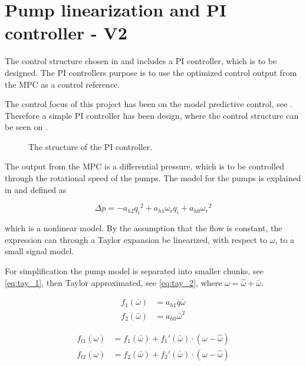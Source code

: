 \chapter{Pump linearization and PI controller - V2}
\label{cha:linear_pump2}

The control structure chosen in  and  includes a PI controller, which is to be designed. The PI controllers purpose is to use the optimized control output from the MPC as a control reference. 

The control focus of this project has been on the model predictive control, see . Therefore a simple PI controller has been design, where the control structure can be seen on .

\begin{figure}[H]
\centering
  
\caption{The structure of the PI controller.}
\label{fig:simple_PI}
\end{figure}

The output from the MPC is a differential pressure, which is to be controlled through the rotational speed of the pumps. The model for the pumps is explained in  and defined as

\begin{equation*}
\Delta p = -a_{h2}{q_i}^2 + a_{h1} \omega_r q_i + a_{h0}{\omega_r}^2
\end{equation*}

which is a nonlinear model. By the assumption that the flow is constant, the expression can through a Taylor expansion be linearized, with respect to $\omega$, to a small signal model.


For simplification the pump model is separated into smaller chunks, see \eqref{eq:tay_1}, then Taylor approximated, see \eqref{eq:tay_2}, where $\omega = \hat{\omega}+\bar{\omega}$.

\begin{equation}
\begin{split}
f_1(\bar{\omega}) &= a_{h1}\bar{q}\bar{\omega} \\
f_2(\bar{\omega}) &= a_{h0}\bar{\omega}^2
\end{split}
\label{eq:tay_1}
\end{equation}


\begin{equation}
\begin{split}
f_{t1}(\omega) &= f_1(\bar{\omega}) + f_1'(\bar{\omega})\cdot(\omega - \hat{\omega}) \\
f_{t2}(\omega) &= f_2(\bar{\omega}) + f_2'(\bar{\omega})\cdot(\omega - \hat{\omega})
\end{split}
\label{eq:tay_2}
\end{equation}


